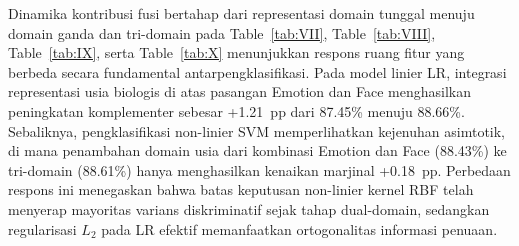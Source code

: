 Dinamika kontribusi fusi bertahap dari representasi domain tunggal menuju domain ganda dan tri-domain pada Table~\ref{tab:VII}, Table~\ref{tab:VIII}, Table~\ref{tab:IX}, serta Table~\ref{tab:X} menunjukkan respons ruang fitur yang berbeda secara fundamental antarpengklasifikasi. Pada model linier LR, integrasi representasi usia biologis di atas pasangan Emotion dan Face menghasilkan peningkatan komplementer sebesar +1.21~pp dari 87.45\% menuju 88.66\%. Sebaliknya, pengklasifikasi non-linier SVM memperlihatkan kejenuhan asimtotik, di mana penambahan domain usia dari kombinasi Emotion dan Face (88.43\%) ke tri-domain (88.61\%) hanya menghasilkan kenaikan marjinal +0.18~pp. Perbedaan respons ini menegaskan bahwa batas keputusan non-linier kernel RBF telah menyerap mayoritas varians diskriminatif sejak tahap dual-domain, sedangkan regularisasi $L_2$ pada LR efektif memanfaatkan ortogonalitas informasi penuaan.
